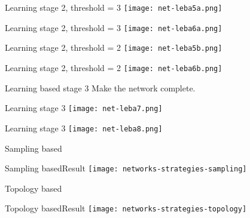 \begin{frame}{Learning stage 2, threshold = 3}
	\centering
	\texttt{[image: net-leba5a.png]}
\end{frame} 



\begin{frame}{Learning stage 2, threshold = 3}
	\centering
	\texttt{[image: net-leba6a.png]}
\end{frame} 

\begin{frame}{Learning stage 2, threshold = 2}
	\centering
	\texttt{[image: net-leba5b.png]}
\end{frame} 
\begin{frame}{Learning stage 2, threshold = 2}
	\centering
	\texttt{[image: net-leba6b.png]}
\end{frame} 

\begin{frame}{Learning based stage 3}
		Make the network complete.
\end{frame}
\begin{frame}{Learning stage 3}
	\centering
	\texttt{[image: net-leba7.png]}
\end{frame} 

\begin{frame}{Learning stage 3}
	\centering
	\texttt{[image: net-leba8.png]}
\end{frame} 

\begin{frame}{Sampling based}

\end{frame}

\begin{frame}{Sampling based}{Result}
	\centering
	\texttt{[image: networks-strategies-sampling]}
\end{frame}

\begin{frame}{Topology based}

\end{frame}

\begin{frame}{Topology based}{Result}
	\centering
	\texttt{[image: networks-strategies-topology]}
\end{frame}

